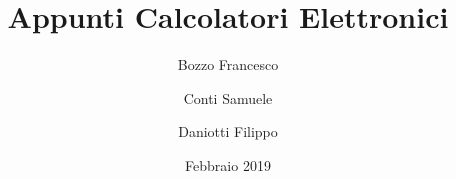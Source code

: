\documentclass[a4paper,12pt]{book}
\begin{document}
\author{Bozzo Francesco \and Conti Samuele \and Daniotti Filippo}
\title{Appunti Calcolatori Elettronici}
\date{Febbraio 2019}

\frontmatter
\maketitle
\tableofcontents

\mainmatter



\backmatter
\end{document}

